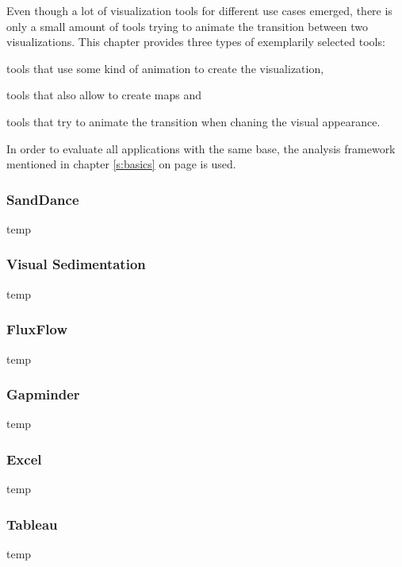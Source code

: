Even though a lot of visualization tools for different use cases emerged, there is only a small amount of tools trying to animate the transition between two visualizations. This chapter provides three types of exemplarily selected tools:

\begin{enumerate*}
\item tools that use some kind of animation to create the visualization,
\item tools that also allow to create maps and
\item tools that try to animate the transition when chaning the visual appearance.
\end{enumerate*}

In order to evaluate all applications with the same base, the analysis framework mentioned in chapter \ref{s:basics} on page \pageref{s:basics} is used.

\subsubsection{SandDance}
temp 

\subsubsection{Visual Sedimentation}
temp 


\subsubsection{FluxFlow}
temp 

\subsubsection{Gapminder}
temp 

\subsubsection{Excel}
temp 

\subsubsection{Tableau}
temp 